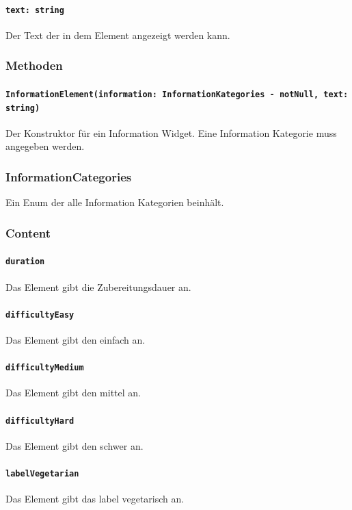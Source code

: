 \documentclass{entwurfsheft}
\begin{document}
            \paragraph*{\texttt{text: string}} Der Text der in dem Element angezeigt werden kann.

        \subsubsection*{Methoden}
            \paragraph*{\texttt{InformationElement(information: InformationKategories - notNull, text: string)}} Der Konstruktor für ein Information Widget. Eine Information Kategorie muss angegeben werden.

    
    \subsubsection{InformationCategories} \label{sec:InformationCategories}
        Ein Enum der alle Information Kategorien beinhält.
        \subsubsection*{Content}
            \paragraph*{\texttt{duration}} Das Element gibt die Zubereitungsdauer an.
            \paragraph*{\texttt{difficultyEasy}} Das Element gibt den  einfach an.
            \paragraph*{\texttt{difficultyMedium}} Das Element gibt den  mittel an.
            \paragraph*{\texttt{difficultyHard}} Das Element gibt den  schwer an.
            \paragraph*{\texttt{labelVegetarian}} Das Element gibt das \gls{label} vegetarisch an.
\end{document}
